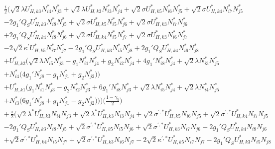 \begin{align} 
 &\frac{i}{2} \Big(\sqrt{2} \lambda U^*_{{H},{k 3}} N^*_{i 4} N^*_{j 3} +\sqrt{2} \lambda U^*_{{H},{k 3}} N^*_{i 3} N^*_{j 4} +\sqrt{2} \sigma U^*_{{H},{k 5}} N^*_{i 6} N^*_{j 5} +\sqrt{2} \sigma U^*_{{H},{k 4}} N^*_{i 7} N^*_{j 5} \nonumber \\ 
 &-2 g_1' Q_{S} U^*_{{H},{k 3}} N^*_{i 8} N^*_{j 5} +\sqrt{2} \sigma U^*_{{H},{k 5}} N^*_{i 5} N^*_{j 6} +\sqrt{2} \sigma U^*_{{H},{k 3}} N^*_{i 7} N^*_{j 6} \nonumber \\ 
 &+2 g_1' Q_{S} U^*_{{H},{k 4}} N^*_{i 8} N^*_{j 6} +\sqrt{2} \sigma U^*_{{H},{k 4}} N^*_{i 5} N^*_{j 7} +\sqrt{2} \sigma U^*_{{H},{k 3}} N^*_{i 6} N^*_{j 7} \nonumber \\ 
 &-2 \sqrt{2} \kappa^\prime U^*_{{H},{k 5}} N^*_{i 7} N^*_{j 7} -2 g_1' Q_{S} U^*_{{H},{k 3}} N^*_{i 5} N^*_{j 8} +2 g_1' Q_{S} U^*_{{H},{k 4}} N^*_{i 6} N^*_{j 8} \nonumber \\ 
 &+U^*_{{H},{k 2}} \Big(\sqrt{2} \lambda N^*_{i 5} N^*_{j 3} - g_1 N^*_{i 1} N^*_{j 4} +g_2 N^*_{i 2} N^*_{j 4} +4 g_1' N^*_{i 8} N^*_{j 4} +\sqrt{2} \lambda N^*_{i 3} N^*_{j 5} \nonumber \\ 
 &+N^*_{i 4} \Big(4 g_1' N^*_{j 8}  - g_1 N^*_{j 1}  + g_2 N^*_{j 2} \Big)\Big)\nonumber \\ 
 &+U^*_{{H},{k 1}} \Big(g_1 N^*_{i 1} N^*_{j 3} - g_2 N^*_{i 2} N^*_{j 3} +6 g_1' N^*_{i 8} N^*_{j 3} +\sqrt{2} \lambda N^*_{i 5} N^*_{j 4} +\sqrt{2} \lambda N^*_{i 4} N^*_{j 5} \nonumber \\ 
 &+N^*_{i 3} \Big(6 g_1' N^*_{j 8}  + g_1 N^*_{j 1}  - g_2 N^*_{j 2} \Big)\Big)\Big)\Big(\frac{1-\gamma_5}{2}\Big)\\ 
  & + \,\frac{i}{2} \Big(\sqrt{2} \lambda^* U^*_{{H},{k 3}} N_{{i 4}} N_{{j 3}} +\sqrt{2} \lambda^* U^*_{{H},{k 3}} N_{{i 3}} N_{{j 4}} +\sqrt{2} \sigma^{\prime,*} U^*_{{H},{k 5}} N_{{i 6}} N_{{j 5}} +\sqrt{2} \sigma^{\prime,*} U^*_{{H},{k 4}} N_{{i 7}} N_{{j 5}} \nonumber \\ 
 &-2 g_1' Q_{S} U^*_{{H},{k 3}} N_{{i 8}} N_{{j 5}} +\sqrt{2} \sigma^{\prime,*} U^*_{{H},{k 5}} N_{{i 5}} N_{{j 6}} +\sqrt{2} \sigma^{\prime,*} U^*_{{H},{k 3}} N_{{i 7}} N_{{j 6}} +2 g_1' Q_{S} U^*_{{H},{k 4}} N_{{i 8}} N_{{j 6}} \nonumber \\ 
 &+\sqrt{2} \sigma^{\prime,*} U^*_{{H},{k 4}} N_{{i 5}} N_{{j 7}} +\sqrt{2} \sigma^{\prime,*} U^*_{{H},{k 3}} N_{{i 6}} N_{{j 7}} -2 \sqrt{2} \kappa^{\prime,*} U^*_{{H},{k 5}} N_{{i 7}} N_{{j 7}} -2 g_1' Q_{S} U^*_{{H},{k 3}} N_{{i 5}} N_{{j 8}} \nonumber \\ 

\end{align}
